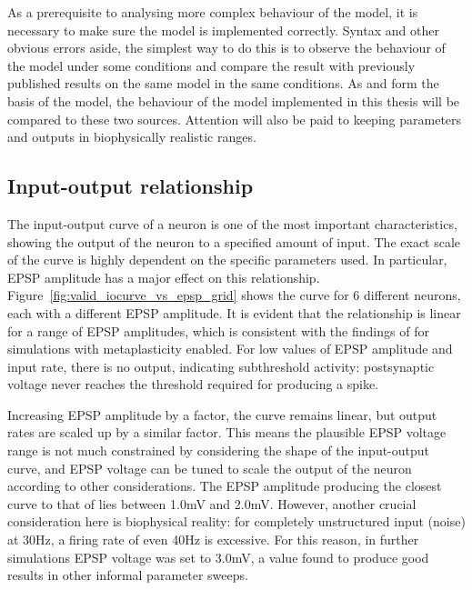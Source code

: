 \documentclass[a4paper,12pt]{report}
\theoremstyle{definition}
\begin{document}
As a prerequisite to analysing more complex behaviour of the model, it is necessary to make sure the model is implemented correctly. Syntax and other obvious errors aside, the simplest way to do this is to observe the behaviour of the model under some conditions and compare the result with previously published results on the same model in the same conditions. As \cite{shouval2002unified} and \cite{yeung2004synaptic} form the basis of the model, the behaviour of the model implemented in this thesis will be compared to these two sources. Attention will also be paid to keeping parameters and outputs in biophysically realistic ranges.

\subsection{Input-output relationship}
\label{subsec:iocurve}

The input-output curve of a neuron is one of the most important characteristics, showing the output of the neuron to a specified amount of input. The exact scale of the curve is highly dependent on the specific parameters used. In particular, EPSP amplitude has a major effect on this relationship. 
Figure~\ref{fig:valid_iocurve_vs_epsp_grid} shows the curve for 6 different neurons, each with a different EPSP amplitude. It is evident that the relationship is linear for a range of EPSP amplitudes, which is consistent with the findings of \cite{yeung2004synaptic} for simulations with metaplasticity enabled. For low values of EPSP amplitude and input rate, there is no output, indicating subthreshold activity: postsynaptic voltage never reaches the threshold required for producing a spike.

Increasing EPSP amplitude by a factor, the curve remains linear, but output rates are scaled up by a similar factor. This means the plausible EPSP voltage range is not much constrained by considering the shape of the input-output curve, and EPSP voltage can be tuned to scale the output of the neuron according to other considerations. The EPSP amplitude producing the closest curve to that of \cite{yeung2004synaptic} lies between 1.0mV and 2.0mV. However, another crucial consideration here is biophysical reality: for completely unstructured input (noise) at 30Hz, a firing rate of even 40Hz is excessive. For this reason, in further simulations EPSP voltage was set to 3.0mV, a value found to produce good results in other informal parameter sweeps.
\end{document}
